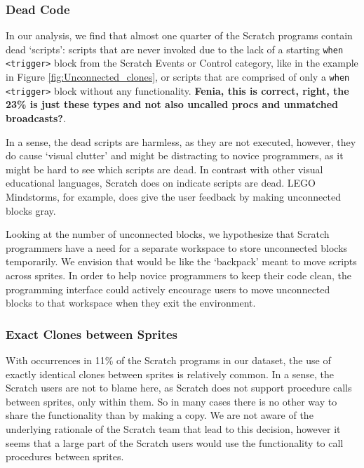 \documentclass{sig-alternate}
\newcommand{\todo}[1]{\textbf{#1}}
\begin{document}
\subsubsection{Dead Code}
In our analysis, we find that almost one quarter of the Scratch programs contain dead `scripts': scripts that are never invoked due to the lack of a starting \texttt{when <trigger>} block from the Scratch Events or Control category, like in the example in Figure \ref{fig:Unconnected_clones}, or scripts that are comprised of only a \texttt{when <trigger>} block without any functionality. \todo{Fenia, this is correct, right, the 23\% is just these types and not also uncalled procs and unmatched broadcasts?}.

In a sense, the dead scripts are harmless, as they are not executed, however, they do cause `visual clutter' and might be distracting to novice programmers, as it might be hard to see which scripts are dead. In contrast with other visual educational languages, Scratch does on indicate scripts are dead. LEGO Mindstorms, for example, does give the user feedback by making unconnected blocks gray. 

Looking at the number of unconnected blocks, we hypothesize that Scratch programmers have a need for a separate workspace to store unconnected blocks temporarily. We envision that would be like the `backpack' meant to move scripts across sprites. In order to help novice programmers to keep their code clean, the programming interface could  actively encourage users to move unconnected blocks to that workspace when they exit the environment.

\subsubsection{Exact Clones between Sprites}
With occurrences in 11\% of the Scratch programs in our dataset, the use of exactly identical clones between sprites is relatively common. In a sense, the Scratch users are not to blame here, as Scratch does not support procedure calls between sprites, only within them. So in many cases there is no other way to share the functionality than by making a copy. We are not aware of the underlying rationale of the Scratch team that lead to this decision, however it seems that a large part of the Scratch users would use the functionality to call procedures between sprites.
\end{document}
